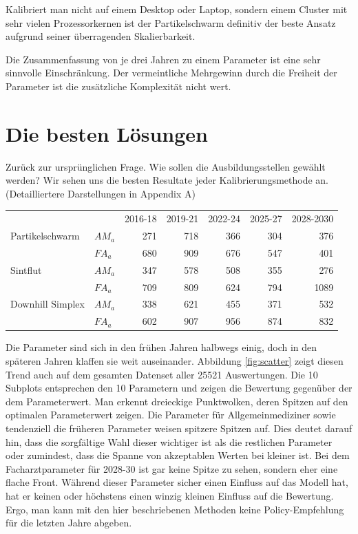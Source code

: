 \documentclass[a4paper,12pt]{article}
\begin{document}
Kalibriert man nicht auf einem Desktop oder Laptop, sondern einem Cluster mit sehr vielen Prozessorkernen ist der Partikelschwarm definitiv der beste Ansatz aufgrund seiner überragenden Skalierbarkeit.

Die Zusammenfassung von je drei Jahren zu einem Parameter ist eine sehr sinnvolle Einschränkung. Der vermeintliche Mehrgewinn durch die Freiheit der Parameter ist die zusätzliche Komplexität nicht wert.

\section{Die besten Lösungen}

Zurück zur ursprünglichen Frage. Wie sollen die Ausbildungsstellen gewählt werden? Wir sehen uns die besten Resultate jeder Kalibrierungsmethode an. (Detailliertere Darstellungen in Appendix A)


\begin{center}
\begin{tabular}{| l | l | r | r | r | r | r |}
\hline
& & 2016-18 & 2019-21 & 2022-24 & 2025-27 & 2028-2030 \\ \hhline{|=|=|=|=|=|=|=|}
Partikelschwarm  & $AM_a$ & 271 & 718 & 366 & 304 & 376\\ \hline
				 & $FA_a$ & 680 & 909 & 676 & 547 & 401\\ \hhline{|=|=|=|=|=|=|=|}
Sintflut	     & $AM_a$ & 347 & 578 & 508 & 355 & 276\\ \hline
				 & $FA_a$ & 709 & 809 & 624 & 794 & 1089\\ \hhline{|=|=|=|=|=|=|=|}
Downhill Simplex & $AM_a$ & 338 & 621 & 455 & 371 & 532\\ \hline
				 & $FA_a$ & 602 & 907 & 956 & 874 & 832\\ \hline
\end{tabular}
\end{center}

Die Parameter sind sich in den frühen Jahren halbwegs einig, doch in den späteren Jahren klaffen sie weit auseinander. Abbildung \ref{fig:scatter} zeigt diesen Trend auch auf dem gesamten Datenset aller 25521 Auswertungen. Die 10 Subplots entsprechen den 10 Parametern und zeigen die Bewertung gegenüber der dem Parameterwert. Man erkennt dreieckige Punktwolken, deren Spitzen auf den optimalen Parameterwert zeigen. Die Parameter für Allgemeinmediziner sowie tendenziell die früheren Parameter weisen spitzere Spitzen auf. Dies deutet darauf hin, dass die sorgfältige Wahl dieser wichtiger ist als die restlichen Parameter oder zumindest, dass die Spanne von akzeptablen Werten bei kleiner ist. Bei dem Facharztparameter für 2028-30 ist gar keine Spitze zu sehen, sondern eher eine flache Front. Während dieser Parameter sicher einen Einfluss auf das Modell hat, hat er keinen oder höchstens einen winzig kleinen Einfluss auf die Bewertung. Ergo, man kann mit den hier beschriebenen Methoden keine Policy-Empfehlung für die letzten Jahre abgeben.
\end{document}
